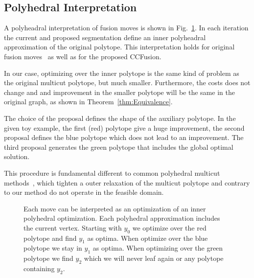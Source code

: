 \documentclass[10pt,twocolumn,letterpaper]{article}
\theoremstyle{definition}
\begin{document}
%
%






\subsection{Polyhedral Interpretation}
A polyheadral interpretation of fusion moves is shown in Fig.~\ref{fig:polyheadral}.
In each iteration the current and proposed segmentation define an inner polyheadral 
approximation of the original polytope. This interpretation holds for original 
fusion moves~\cite{Lempitsky-2010} as well as for the proposed CCFusion.

In our case, optimizing over the inner polytope is the same kind of problem as the original multicut polytope, but much smaller.
Furthermore, the costs does not change and and improvement in the smaller polytope will 
be the same in the original graph, as shown in Theorem~\ref{thm:Equivalence}.

The choice of the proposal defines the shape of the auxiliary polytope. 
In the given toy example, the first (red) polytope give a huge improvement, the second proposal
defines the blue polytope which does not lead to an improvement. 
The third proposal generates the green polytope that includes the global optimal solution.

This procedure is fundamental different to common polyhedral multicut methods~\cite{kappes_2011_emmcvpr,kappes_2013_arxiv}, 
which tighten a outer relaxation of the multicut polytope and contrary to our method do not operate in the feasible domain. 



\begin{figure}
\centering

\caption{Each move can be interpreted as an optimization of an inner polyhedral optimization.
Each polyhedral approximation includes the current vertex. Starting with $y_0$ we optimize over the red polytope 
and find $y_1$ as optima. When optimize over the blue polytope we stay in $y_1$ as optima.
When optimizing over the green polytope we find $y_2$ which we will never leaf again or any polytope containing $y_2$. 
}
\label{fig:polyheadral}
\end{figure}
\end{document}

